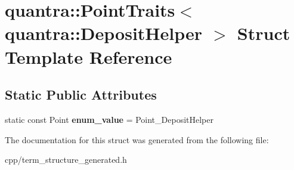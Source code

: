 \hypertarget{structquantra_1_1PointTraits_3_01quantra_1_1DepositHelper_01_4}{}\section{quantra\+:\+:Point\+Traits$<$ quantra\+:\+:Deposit\+Helper $>$ Struct Template Reference}
\label{structquantra_1_1PointTraits_3_01quantra_1_1DepositHelper_01_4}
\subsection*{Static Public Attributes}
\begin{DoxyCompactItemize}
\item 
\mbox{\label{structquantra_1_1PointTraits_3_01quantra_1_1DepositHelper_01_4_acda81831919b8fb83915bec08ac1b23e}} 
static const Point {\bfseries enum\+\_\+value} = Point\+\_\+\+Deposit\+Helper
\end{DoxyCompactItemize}


The documentation for this struct was generated from the following file\+:\begin{DoxyCompactItemize}
\item 
cpp/term\+\_\+structure\+\_\+generated.\+h\end{DoxyCompactItemize}
